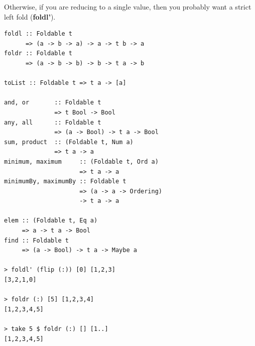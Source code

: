 \begin{multicols}{2}
\begin{box1}
Otherwise, if you are reducing to a single value, then you probably want a
strict left fold (\textbf{foldl'}).

\begin{verbatim}
foldl :: Foldable t
      => (a -> b -> a) -> a -> t b -> a	
foldr :: Foldable t
      => (a -> b -> b) -> b -> t a -> b	

toList :: Foldable t => t a -> [a]	

and, or       :: Foldable t
              => t Bool -> Bool	
any, all      :: Foldable t
              => (a -> Bool) -> t a -> Bool	
sum, product  :: (Foldable t, Num a)
              => t a -> a	
minimum, maximum     :: (Foldable t, Ord a)
                     => t a -> a	
minimumBy, maximumBy :: Foldable t
                     => (a -> a -> Ordering)
                     -> t a -> a	

elem :: (Foldable t, Eq a)
     => a -> t a -> Bool	
find :: Foldable t
     => (a -> Bool) -> t a -> Maybe a

> foldl' (flip (:)) [0] [1,2,3]
[3,2,1,0]

> foldr (:) [5] [1,2,3,4]
[1,2,3,4,5]

> take 5 $ foldr (:) [] [1..]
[1,2,3,4,5]


\end{verbatim}
\end{box1}

\end{multicols}

